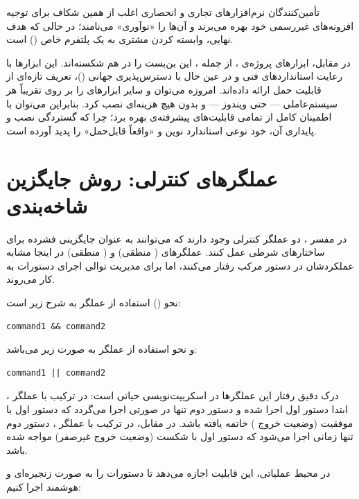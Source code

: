 تأمین‌کنندگان نرم‌افزارهای تجاری و انحصاری اغلب از همین شکاف برای توجیه افزونه‌های غیررسمی خود بهره می‌برند و آن‌ها را «نوآوری» می‌نامند؛ در حالی که هدف نهایی، وابسته کردن مشتری به یک پلتفرم خاص () است.

در مقابل، ابزارهای پروژه‌ی ، از جمله ، این بن‌بست را در هم شکسته‌اند. این ابزارها با رعایت استانداردهای فنی و در عین حال با دسترس‌پذیری جهانی ()، تعریف تازه‌ای از قابلیت حمل ارائه داده‌اند. امروزه می‌توان  و سایر ابزارهای  را بر روی تقریباً هر سیستم‌عاملی — حتی ویندوز — و بدون هیچ هزینه‌ای نصب کرد. بنابراین می‌توان با اطمینان کامل از تمامی قابلیت‌های پیشرفته‌ی  بهره برد؛ چرا که گستردگی نصب و پایداری آن، خود نوعی استاندارد نوین و «واقعاً قابل‌حمل» را پدید آورده است.

\section{عملگرهای کنترلی: روش جایگزین شاخه‌بندی}

در مفسر ، دو عملگر کنترلی وجود دارند که می‌توانند به عنوان جایگزینی فشرده برای ساختارهای شرطی عمل کنند. عملگرهای \cmd{\&\&} ( منطقی) و \cmd{||} ( منطقی) در اینجا مشابه عملکردشان در دستور مرکب \cmd{[[ ]]} رفتار می‌کنند، اما برای مدیریت توالی اجرای دستورات به کار می‌روند.

نحو () استفاده از عملگر \cmd{\&\&} به شرح زیر است:

\begin{latin}
\begin{lstlisting}
command1 && command2
\end{lstlisting}
\end{latin}

و نحو استفاده از عملگر \cmd{||} به صورت زیر می‌باشد:

\begin{latin}
\begin{lstlisting}
command1 || command2
\end{lstlisting}
\end{latin}

درک دقیق رفتار این عملگرها در اسکریپت‌نویسی حیاتی است: در ترکیب با عملگر \cmd{\&\&}، ابتدا دستور اول اجرا شده و دستور دوم تنها در صورتی اجرا می‌گردد که دستور اول با موفقیت (وضعیت خروج ) خاتمه یافته باشد. در مقابل، در ترکیب با عملگر \cmd{||}، دستور دوم تنها زمانی اجرا می‌شود که دستور اول با شکست (وضعیت خروج غیرصفر) مواجه شده باشد.

در محیط عملیاتی، این قابلیت اجازه می‌دهد تا دستورات را به صورت زنجیره‌ای و هوشمند اجرا کنیم:

